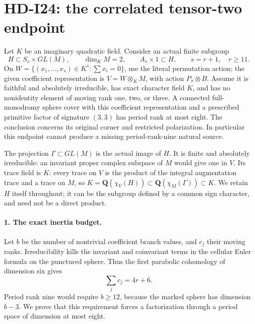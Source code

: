 \section{HD-I24: the correlated tensor-two endpoint}
\label{sec:correlated-tensor-two-rank-four}

Let \(K\) be an imaginary quadratic field. Consider an actual finite
subgroup
\[
 H\subset S_s\times GL(M),\qquad \dim_K M=2,\qquad
 A_s\times1\subset H,\qquad s=r+1,\quad r\ge11.             \tag{I24.1}
\]
On \(W=\{(x_1,\ldots,x_s)\in K^s:\sum x_i=0\}\), use the
literal permutation action; the given coefficient representation is
\(V=W\otimes_K M\), with action \(P_\pi\otimes B\).
Assume it is faithful and absolutely irreducible, has exact character
field \(K\), and has no nonidentity element of moving rank one, two,
or three. A connected full-monodromy sphere cover with this coefficient
representation and a prescribed primitive factor of signature \((3,3)\)
has period rank at most eight. The conclusion concerns its original
corner and restricted polarization. In particular this endpoint cannot
produce a missing period-rank-nine natural source.

The projection \(\Gamma\subset GL(M)\) is the actual image of \(H\).
It is finite and absolutely irreducible: an invariant proper complex
subspace of \(M\) would give one in \(V\). Its trace field is \(K\):
every trace on \(V\) is the product of the integral augmentation trace
and a trace on \(M\), so
\(K=\mathbf Q(\chi_V(H))\subset\mathbf Q(\chi_M(\Gamma))\subset K\).
We retain \(H\) itself throughout; it can be the subgroup defined by a
common sign character, and need not be a direct product.

\paragraph{1. The exact inertia budget.}
Let \(b\) be the number of nontrivial coefficient branch values, and
\(c_j\) their moving ranks. Irreducibility kills the invariant and
coinvariant terms in the cellular Euler formula on the punctured
sphere. Thus the first parabolic cohomology of dimension six gives
\[
                 \sum_jc_j=4r+6.                           \tag{I24.2}
\]
Period rank nine would require \(b\ge12\), because the marked sphere
has dimension \(b-3\). We prove that this requirement forces a
factorization through a period space of dimension at most eight.

